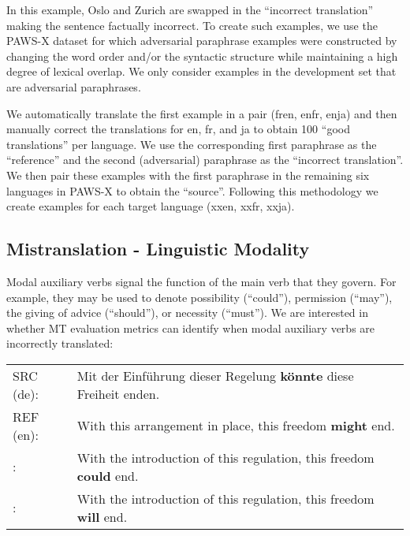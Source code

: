 \documentclass[11pt]{article}
\newcommand{\cmark}{\textcolor{darkpastelgreen}{\ding{51}}}\newcommand{\xmark}{\textcolor{darkpastelred}{\ding{55}}}
\begin{document}
In this example, Oslo and Zurich are swapped in the ``incorrect translation'' making the sentence factually incorrect. To create such examples, we use the PAWS-X dataset for which adversarial paraphrase examples were constructed by changing the word order and/or the syntactic structure while maintaining a high degree of lexical overlap. We only consider examples in the development set that are adversarial paraphrases.

We automatically translate the first example in a pair (fren, enfr, enja) and then manually correct the translations for en, fr, and ja to obtain 100 ``good translations'' per language. We use the corresponding first paraphrase as the ``reference'' and the second (adversarial) paraphrase as the ``incorrect translation''. We then pair these examples with the first paraphrase in the remaining six languages in PAWS-X to obtain the ``source''. Following this methodology we create examples for each target language (xxen, xxfr, xxja).


\subsection{Mistranslation - Linguistic Modality}
Modal auxiliary verbs signal the function of the main verb that they govern. For example, they may be used to denote possibility (``could''), permission (``may''), the giving of advice (``should''), or necessity (``must''). We are interested in whether MT evaluation metrics can identify when modal auxiliary verbs are incorrectly translated:

\begin{small}
\vspace{0.5cm}
\setlength{\extrarowheight}{0.1cm}
\begin{tabularx}{0.95\columnwidth}{lX}
     SRC (de): & Mit der Einführung dieser Regelung \textbf{könnte} diese Freiheit enden.\\
     REF (en): & With this arrangement in place, this freedom \textbf{might} end.\\
     \cmark{}: & With the introduction of this regulation, this freedom \textbf{could} end.\\
     \xmark{}: & With the introduction of this regulation, this freedom \textbf{will} end.
     \vspace{0.35cm}
\end{tabularx}
\end{small}
\end{document}
